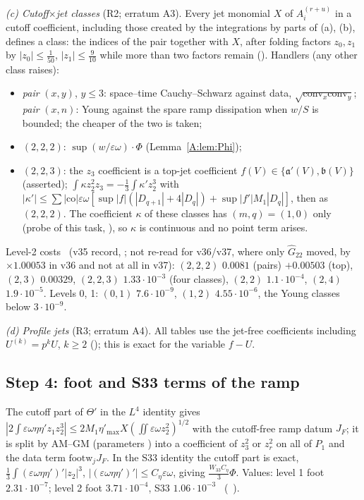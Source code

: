 \documentclass[11pt]{article}
\begin{document}
\emph{(c) Cutoff$\times$jet classes} (R2; erratum A3). Every jet monomial $X$ of $A_i^{(r+u)}$ in a cutoff coefficient, including those created by the integrations by parts of (a), (b), defines a class: the indices of the pair together with $X$, after folding factors $z_0,z_1$ by $|z_0|\le\frac1{50}$, $|z_1|\le\frac9{10}$ while more than two factors remain (). Handlers (any other class raises):
\begin{itemize}[leftmargin=*]
\item \emph{pair} $(x,y)$, $y\le3$: space--time Cauchy--Schwarz against data, $\sqrt{\mathrm{conv}_x\mathrm{conv}_y}$; \emph{pair} $(x,n)$: Young against the spare ramp dissipation when $w/S$ is bounded; the cheaper of the two is taken;
\item \emph{$(2,2,2)$}: $\sup(w/\varepsilon\omega)\cdot\Phi$ (Lemma~\ref{A:lem:Phi});
\item \emph{$(2,2,3)$}: the $z_3$ coefficient is a top-jet coefficient $f(V)\in\{\mathfrak a'(V),\mathfrak b(V)\}$ (asserted); $\int\kappa z_2^2z_3=-\frac13\int\kappa'z_2^3$ with $|\kappa'|\le\sum|\mathrm{co}|\varepsilon\omega[\sup|f|(|D_{q+1}|+4|D_q|)+\sup|f'|M_1|D_q|]$, then as $(2,2,2)$. The coefficient $\kappa$ of these classes has $(m,q)=(1,0)$ only (probe of this task, ), so $\kappa$ is continuous and no point term arises.
\end{itemize}
Level-2 costs \tC\ (v35 record, ; not re-read for v36/v37, where only $\hat G_{22}$ moved, by $\times1.00053$ in v36 and not at all in v37): $(2,2,2)$ $0.0081$ (pairs) $+0.00503$ (top), $(2,3)$ $0.00329$, $(2,2,3)$ $1.33\cdot10^{-3}$ (four classes), $(2,2)$ $1.1\cdot10^{-4}$, $(2,4)$ $1.9\cdot10^{-5}$. Levels 0, 1: $(0,1)$ $7.6\cdot10^{-9}$, $(1,2)$ $4.55\cdot10^{-6}$, the Young classes below $3\cdot10^{-9}$.

\emph{(d) Profile jets} (R3; erratum A4). All tables use the jet-free coefficients including $U^{(k)}=p^kU$, $k\ge2$ (); this is exact for the variable $f-U$.

\subsection{Step 4: foot and S33 terms of the ramp}\label{A:sec:foot}
The cutoff part of $\Theta'$ in the $L^4$ identity gives $|2\int\varepsilon\omega\eta\eta'z_1z_2^3|\le2M_1\eta'_{\max}X(\iint\varepsilon\omega z_2^2)^{1/2}$ with the cutoff-free ramp datum $J_F$; it is split by AM--GM (parameters ) into a coefficient of $z_3^2$ or $z_r^2$ on all of $P_1$ and the data term $\mathrm{footw}_jJ_F$. In the S33 identity the cutoff part is exact, $\frac13\int(\varepsilon\omega\eta\eta')'|z_2|^3$, $|(\varepsilon\omega\eta\eta')'|\le C_\eta\varepsilon\omega$, giving $\frac{W_{33}C_\eta}3\Phi$. Values: level 1 foot $2.31\cdot10^{-7}$; level 2 foot $3.71\cdot10^{-4}$, S33 $1.06\cdot10^{-3}$ \tC\ (\SA\ ).
\end{document}
